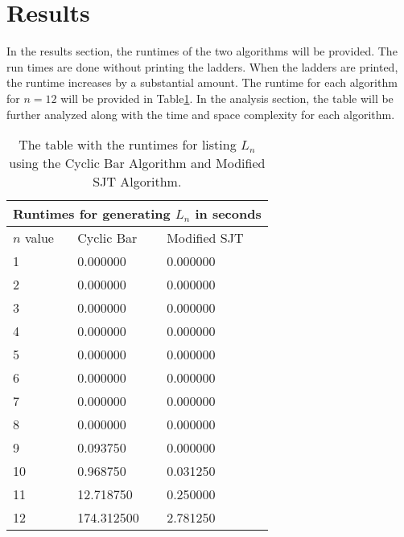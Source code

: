 \section{Results}
    In the results section, the runtimes of the two algorithms will be provided. The run times are done without printing the ladders. 
    When the ladders are printed, the runtime increases by a substantial amount. 
    The runtime for each algorithm for $n=12$ will be provided in Table\ref{Table:ListingResults}. 
    In the analysis section, the table will be further analyzed along with 
    the time and space complexity for each algorithm.
 \begin{center}
    \begin{table}
        \centering
    \begin{tabular}{ |p{3cm}||p{3cm}|p{3cm}|}
        \hline
        \multicolumn{3}{|c|}{Runtimes for generating $L_{n}$ in seconds} \\
        \hline
            $n$ value& Cyclic Bar & Modified SJT\\
        \hline
            1   & 0.000000    &0.000000\\
            \hline
            2 &   0.000000  & 0.000000\\

            \hline
            3 &0.000000 & 0.000000\\
            \hline
            4 &0.000000 & 0.000000\\
            \hline
            5 &   0.000000  & 0.000000\\
            \hline
            6 & 0.000000  & 0.000000  \\
            \hline
            7 & 0.000000  & 0.000000\\
            \hline
            8 & 0.000000 & 0.000000\\
            \hline
            9 & 0.093750 & 0.000000\\
            \hline
            10 & 0.968750 & 0.031250\\
            \hline

            11 & 12.718750 & 0.250000\\
            \hline 
            12 & 174.312500 & 2.781250\\
        \hline
    \end{tabular}
    \caption{The table with the runtimes for listing $L_{n}$ using the Cyclic Bar Algorithm and Modified SJT Algorithm.}
    \label{Table:ListingResults}
    \end{table}
\end{center}\pagebreak